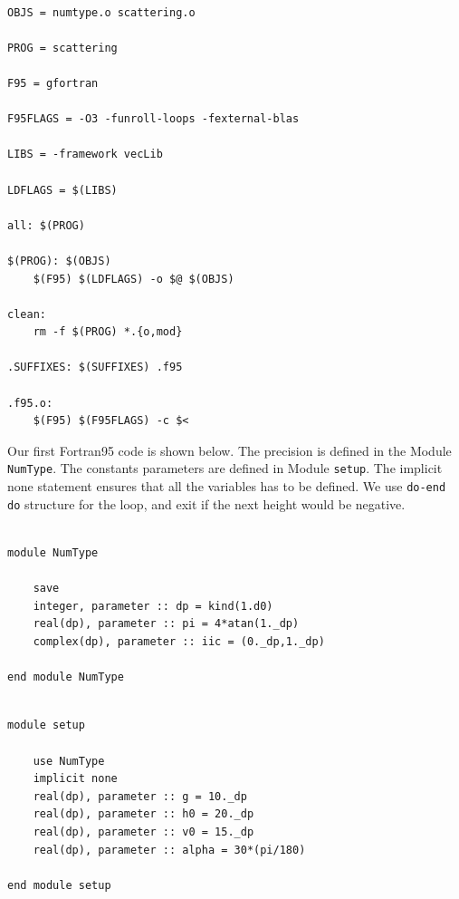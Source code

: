 \documentclass[12pt]{article}
\begin{document}
\begin{lstlisting}[frame=single,caption={Typical {\tt Makefile}},label=makefile]

OBJS = numtype.o scattering.o 

PROG = scattering

F95 = gfortran

F95FLAGS = -O3 -funroll-loops -fexternal-blas

LIBS = -framework vecLib

LDFLAGS = $(LIBS)

all: $(PROG) 

$(PROG): $(OBJS)
	$(F95) $(LDFLAGS) -o $@ $(OBJS) 

clean:
	rm -f $(PROG) *.{o,mod}

.SUFFIXES: $(SUFFIXES) .f95

.f95.o:
	$(F95) $(F95FLAGS) -c $<

\end{lstlisting}

Our first   Fortran95 code is shown below. The precision is defined in the Module {\tt NumType}. The constants parameters are defined in Module {\tt setup}. The implicit none statement ensures that all the variables has to be defined. We use {\tt do-end do} structure for the loop, and exit if the next height would be negative. 


\begin{lstlisting}[frame=single,caption={Module {\tt NumType}},label=module]

module NumType

	save
	integer, parameter :: dp = kind(1.d0)
	real(dp), parameter :: pi = 4*atan(1._dp)
	complex(dp), parameter :: iic = (0._dp,1._dp)
	
end module NumType

\end{lstlisting}


\begin{lstlisting}[frame=single,caption={The {\tt setup} module.},label=setup]

module setup

	use NumType
	implicit none
	real(dp), parameter :: g = 10._dp
	real(dp), parameter :: h0 = 20._dp
	real(dp), parameter :: v0 = 15._dp
	real(dp), parameter :: alpha = 30*(pi/180)
	
end module setup

\end{lstlisting}
\end{document}
